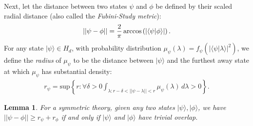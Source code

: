 \documentclass[letterpaper,12pt]{article}
\newtheorem{lem}{Lemma}
\newcommand{\ban}{\begin{eqnarray*}}
\newcommand{\ean}{\end{eqnarray*}}
\newcommand{\braket}[2]{\mbox{$ \langle #1 | #2 \rangle $}}
\begin{document}
Next, let the distance between two states $\psi$ and $\phi$ be defined by their scaled radial distance (also called the \emph{Fubini-Study metric}):
\ban ||\psi-\phi|| = \frac{2}{\pi}\arccos\left(|\braket{\psi}{\phi}|\right). \ean
For any state $ | \psi \rangle \in H_d$, with probability
distribution $\mu_{\psi}(\lambda)=f_{\psi}(| \langle \psi | \lambda
\rangle |^2)$, we define the \textit{radius} of $\mu_\psi$ to be the
distance between $ | \psi \rangle $ and the furthest away state at
which $\mu_\psi$ has substantial density:
\begin{eqnarray}
r_{\psi} = \mbox{sup}\left\{r: \forall \delta>0 \int_{\lambda: r-\delta
<||\psi-\lambda|| <r} \mu_\psi (\lambda) \,d \lambda >0 \right\}.
\label{defr}
\end{eqnarray}

\begin{lem}
\label{rsupp} For a symmetric theory, given any two states $ | \psi
\rangle, | \phi \rangle $, we have $||\psi-\phi||\geq
r_{\psi}+r_{\phi}$ if and only if $ | \psi \rangle $ and $ |
\phi \rangle $ have trivial overlap.
\end{lem}
\end{document}
